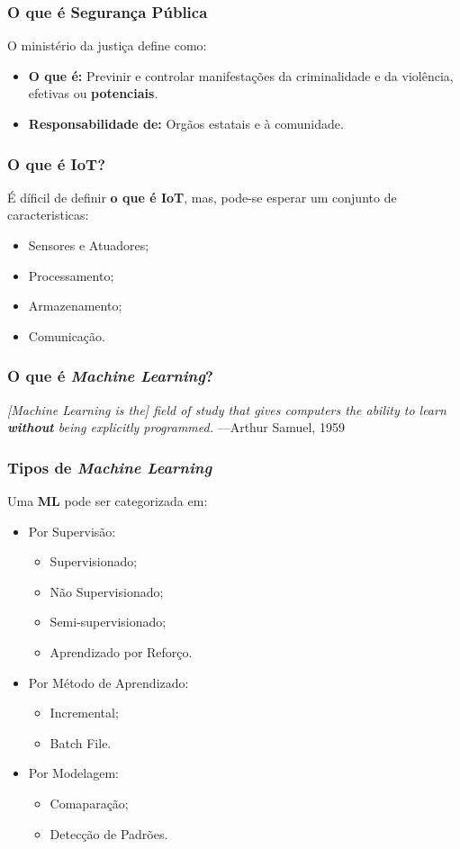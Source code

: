 \begin{frame}
	\frametitle{O que é Segurança Pública}
	O ministério da justiça\cite{seguranca-publica} define como:
	\begin{itemize}
		\item \textbf{O que é:}
		Previnir e controlar manifestações da criminalidade
		e da violência, efetivas ou \textbf{potenciais}.
		\item \textbf{Responsabilidade de:}
		Orgãos estatais e à comunidade.
	\end{itemize}
\end{frame}

\begin{frame}
	\frametitle{O que é IoT?}

	É díficil de definir \textbf{o que é IoT}, mas,	pode-se 
	esperar um conjunto de caracteristicas\cite{iot-definition}:
	\begin{itemize}
	\item Sensores e Atuadores;
	\item Processamento;
	\item Armazenamento;
	\item Comunicação.
	\end{itemize}
\end{frame}

\begin{frame}
	\frametitle{O que é \textit{Machine Learning}?}
	\textit{[Machine  Learning  is  the]  field  of  study  that  gives  computers  the  ability  to  learn
	\textbf{without} being explicitly programmed.}
	—Arthur Samuel, 1959
\end{frame}

\begin{frame}
	\frametitle{Tipos de \textit{Machine Learning}}
	Uma \textbf{ML} pode ser categorizada\cite{machine-learning} em:
	\begin{itemize}[<+->]
		\item Por Supervisão:
			\begin{itemize}[<+->]
				\item Supervisionado;
				\item Não Supervisionado;
				\item Semi-supervisionado;
				\item Aprendizado por Reforço.
			\end{itemize}	
		\item Por Método de Aprendizado:
			\begin{itemize}[<+->]
				\item Incremental;
				\item Batch File.
			\end{itemize}
		\item Por Modelagem:
		\begin{itemize}[<+->]
			\item Comaparação;
			\item Detecção de Padrões.
		\end{itemize}
	\end{itemize}	
\end{frame}